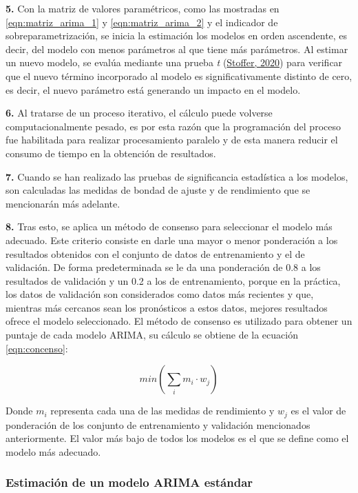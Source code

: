 \documentclass[
]{article}
\begin{document}
\textbf{5.} Con la matriz de valores paramétricos, como las mostradas en
\eqref{eqn:matriz_arima_1} y \eqref{eqn:matriz_arima_2} y el indicador
de sobreparametrización, se inicia la estimación los modelos en orden
ascendente, es decir, del modelo con menos parámetros al que tiene más
parámetros. Al estimar un nuevo modelo, se evalúa mediante una prueba
\emph{t} (\protect\hyperlink{ref-astsa}{Stoffer, 2020}) para verificar
que el nuevo término incorporado al modelo es significativamente
distinto de cero, es decir, el nuevo parámetro está generando un impacto
en el modelo.

\textbf{6.} Al tratarse de un proceso iterativo, el cálculo puede
volverse computacionalmente pesado, es por esta razón que la
programación del proceso fue habilitada para realizar procesamiento
paralelo y de esta manera reducir el consumo de tiempo en la obtención
de resultados.

\textbf{7.} Cuando se han realizado las pruebas de significancia
estadística a los modelos, son calculadas las medidas de bondad de
ajuste y de rendimiento que se mencionarán más adelante.

\textbf{8.} Tras esto, se aplica un método de consenso para seleccionar
el modelo más adecuado. Este criterio consiste en darle una mayor o
menor ponderación a los resultados obtenidos con el conjunto de datos de
entrenamiento y el de validación. De forma predeterminada se le da una
ponderación de 0.8 a los resultados de validación y un 0.2 a los de
entrenamiento, porque en la práctica, los datos de validación son
considerados como datos más recientes y que, mientras más cercanos sean
los pronósticos a estos datos, mejores resultados ofrece el modelo
seleccionado. El método de consenso es utilizado para obtener un puntaje
de cada modelo ARIMA, su cálculo se obtiene de la ecuación
\eqref{eqn:concenso}:

\begin{equation}
\label{eqn:concenso}
min\left( \sum_i {m_i}\cdot w_j \right)
\end{equation}

Donde \(m_i\) representa cada una de las medidas de rendimiento y
\(w_j\) es el valor de ponderación de los conjunto de entrenamiento y
validación mencionados anteriormente. El valor más bajo de todos los
modelos es el que se define como el modelo más adecuado.

\subsubsection{Estimación de un modelo ARIMA estándar}
\end{document}
